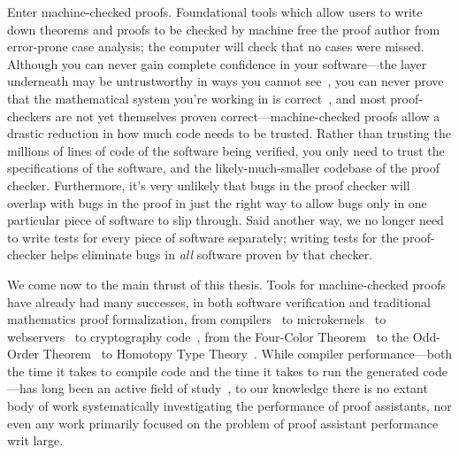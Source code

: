 Enter machine-checked proofs.
Foundational tools which allow users to write down theorems and proofs to be checked by machine free the proof author from error-prone case analysis; the computer will check that no cases were missed.
Although you can never gain complete confidence in your software---the layer underneath may be untrustworthy in ways you cannot see~\cite{Reflections1984Thompson}, you can never prove that the mathematical system you're working in is correct~\cite{sep-goedel-incompleteness}, and most proof-checkers are not yet themselves proven correct---machine-checked proofs allow a drastic reduction in how much code needs to be trusted.
Rather than trusting the millions of lines of code of the software being verified, you only need to trust the specifications of the software, and the likely-much-smaller codebase of the proof checker.
Furthermore, it's very unlikely that bugs in the proof checker will overlap with bugs in the proof in just the right way to allow bugs only in one particular piece of software to slip through.
Said another way, we no longer need to write tests for every piece of software separately; writing tests for the proof-checker helps eliminate bugs in \emph{all} software proven by that checker.

We come now to the main thrust of this thesis.
Tools for machine-checked proofs have already had many successes, in both software verification and traditional mathematics proof formalization, from compilers~\cite{Compcert} to microkernels~\cite{seL4SOSP09} to webservers~\cite{Network2015Chlipala} to cryptography code~\cite{FiatCryptoSP19}, from the Four-Color Theorem~\cite{gonthier2008formal} to the Odd-Order Theorem~\cite{gonthier2013machine} to Homotopy Type Theory~\cite{HoTTBook}.
While compiler performance---both the time it takes to compile code and the time it takes to run the generated code---has long been an active field of study~\cite{CC++Performance2017,georges2007statistically,mytkowicz-wrong-data}, to our knowledge there is no extant body of work systematically investigating the performance of proof assistants, nor even any work primarily focused on the problem of proof assistant performance writ large.

